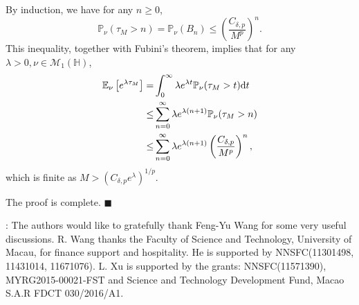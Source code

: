 \documentclass[12pt,a4paper]{article}
\theoremstyle{definition}
\theoremstyle{remark}
\numberwithin{equation}{section}
\newcommand{\M}{\mathcal{M}}
\newcommand{\E}{\mathbb{E}}            %
\newcommand{\HH}{\mathbb{H}}
\newcommand{\PP}{\mathbb{P}}
\newcommand{\dif}{{\rm d}}
\newenvironment{proof}{\par\noindent{\bf Proof:}}{\hspace*{\fill}$\blacksquare$\par}
\begin{document}
{\begin{proof}
By induction, we have for any $n\ge0$,
$$
\PP_{\nu}(\tau_M>n)=\PP_{\nu}(B_n)\le \left(\frac{C_{\delta,p}}{M^p}\right)^n.
$$
This inequality, together with Fubini's theorem, implies that for any $\lambda>0,\nu\in\M_1(\HH)$,
\begin{align*}
\E_{\nu}\left[ e^{\lambda\tau_M}\right]=&\int_0^{\infty}\lambda e^{\lambda t}\PP_{\nu}(\tau_M>t)\dif t\\
\le &\sum_{n=0}^{\infty}\lambda e^{\lambda (n+1)}\PP_{\nu}(\tau_M>n)\\
\le &\sum_{n=0}^{\infty}\lambda e^{\lambda (n+1)}\left(\frac{C_{\delta,p}}{M^p}\right)^n,
\end{align*}
which is finite as $M>(C_{\delta,p} e^{\lambda})^{1/p}$.

The proof is complete.
\end{proof}



\vskip0.3cm
: The authors  would like to gratefully thank Feng-Yu Wang for some very useful discussions. R. Wang thanks the  Faculty of Science and Technology, University of Macau, for finance support and hospitality.   He is supported by NNSFC(11301498, 11431014, 11671076).  L. Xu is supported by the grants: NNSFC(11571390), MYRG2015-00021-FST and Science and Technology Development Fund, Macao S.A.R FDCT 030/2016/A1.


\end{document}
